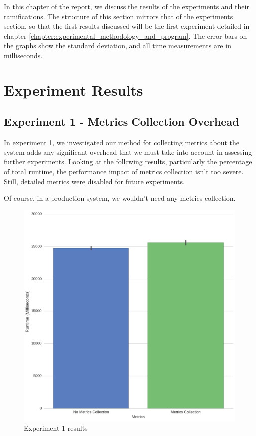 
In this chapter of the report, we discuss the results of the experiments and their ramifications. The structure of this section mirrors that of the experiments section, so that the first results discussed will be the first experiment detailed in chapter \ref{chapter:experimental_methodology_and_program}. The error bars on the graphs show the standard deviation, and all time measurements are in milliseconds.



\section{Experiment Results}



\subsection{Experiment 1 - Metrics Collection Overhead}

In experiment 1, we investigated our method for collecting metrics about the system adds any significant overhead that we must take into account in assessing further experiments. Looking at the following results, particularly the percentage of total runtime, the performance impact of metrics collection isn't too severe. Still, detailed metrics were disabled for future experiments.

Of course, in a production system, we wouldn't need any metrics collection.


\begin{figure}[H]
	\centering
	\includegraphics[width=\textwidth]{graphics/experiment1.png}
	\caption{Experiment 1 results}
	\label{fig:results_ex1}
\end{figure}

